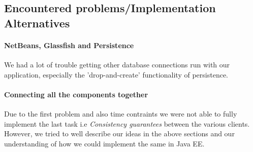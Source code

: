 \documentclass[twoside,colorbacktitle,accentcolor=tud1b]{tudexercise}
\begin{document}
\subsection{Encountered problems/Implementation Alternatives}
\paragraph{NetBeans, Glassfish and Persistence}
We had a lot of trouble getting other database connections run with our application, especially the 'drop-and-create' functionality of persistence.
\paragraph{Connecting all the components together}
Due to the first problem and also time contraints we were not able to fully implement the last task i.e \textit{Consistency guarantees} between the various clients. However, we tried to well describe our ideas in the above sections and our understanding of how we could implement the same in Java EE. 
\end{document}
